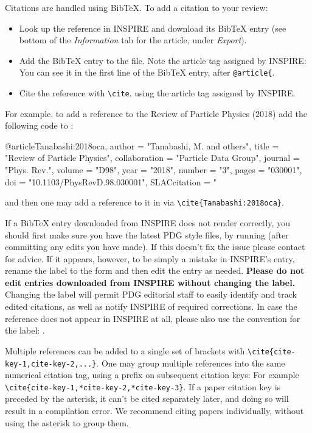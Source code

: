 \label{sec:cites}

Citations are handled using BibTeX. To add a citation to your review:
\begin{itemize}
\item Look up the reference in INSPIRE and download its BibTeX entry (see bottom of the \emph{Information} tab for the article, under \emph{Export}).
\item Add the BibTeX entry to the  file. Note the article tag assigned by INSPIRE: You can see it in the first line of the BibTeX entry, after \lstinline!@article{!.
\item Cite the reference with \lstinline{\cite}, using the article tag assigned by INSPIRE.
\end{itemize}

For example, to add a reference to the Review of Particle Physics (2018) 
add the following code to :
\begin{verbtex}
@article{Tanabashi:2018oca,
      author         = "Tanabashi, M. and others",
      title          = "{Review of Particle Physics}",
      collaboration  = "Particle Data Group",
      journal        = "Phys. Rev.",
      volume         = "D98",
      year           = "2018",
      number         = "3",
      pages          = "030001",
      doi            = "10.1103/PhysRevD.98.030001",
      SLACcitation   = "%
 }
\end{verbtex}
and then one may add a reference to it in  via \lstinline!\cite{Tanabashi:2018oca}!.

If a BibTeX entry downloaded from INSPIRE does not render correctly, 
you should first make sure you have the latest PDG style files, by running  (after committing any edits you have made).
If this doesn't fix the issue please contact  for advice.  
If it appears, however, to be simply a mistake in INSPIRE's entry, 
rename the label to the form  and then edit the entry as needed.
\textbf{Please do not edit entries downloaded from INSPIRE without changing the label.}
Changing the label will permit PDG editorial staff to easily identify and track edited citations, as well as notify INSPIRE of required corrections.
In case the reference does not appear in INSPIRE at all, please also use the convention for the label: .

Multiple references can be added to a single set of brackets with \lstinline!\cite{cite-key-1,cite-key-2,...}!.
One may group multiple references into the same numerical citation tag, using a \invt{*} prefix on subsequent citation keys: For example \lstinline!\cite{cite-key-1,*cite-key-2,*cite-key-3}!.
If a paper citation key is preceded by the asterisk, it can't be cited separately later, and doing so will result in a compilation error.
We recommend citing papers individually, without using the asterisk to group them.


